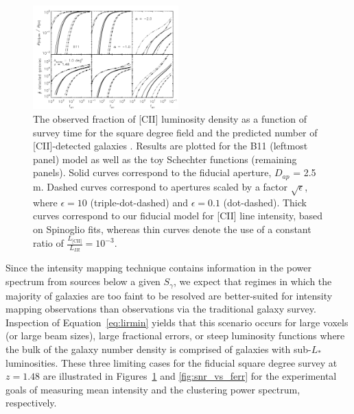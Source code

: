 \documentclass[iop]{emulateapj}
\begin{document}
\begin{figure}
\centering
\includegraphics[width=0.5\textwidth]{Ngal_fracCII_STARFIRE_1sqdeg_z1p5_ferr_0p1vpix_vpix_10vpix_alpham1p0_alpham2p0_b11}
\caption{The observed fraction of [CII] luminosity density as a function of survey time for the square degree field and the predicted number of [CII]-detected galaxies . Results are plotted for the B11 (leftmost panel) model as well as the toy Schechter functions (remaining panels). Solid curves correspond to the fiducial aperture, $D_{ap}$ = 2.5 m. Dashed curves correspond to apertures scaled by a factor $\sqrt{\epsilon}$, where $\epsilon=10$ (triple-dot-dashed) and $\epsilon=0.1$ (dot-dashed). Thick curves correspond to our fiducial model for [CII] line intensity, based on Spinoglio fits, whereas thin curves denote the use of a constant ratio of $\frac{L_{\textrm{[CII]}}}{L_{IR}} = 10^{-3}$.}
\label{fig:ngal_frac}
\end{figure}

Since the intensity mapping technique contains information in the power spectrum from sources below a given $S_{\gamma}$, we expect that regimes in which the majority of galaxies are too faint to be resolved are better-suited for intensity mapping observations than observations via the traditional galaxy survey. Inspection of Equation~\ref{eq:lirmin} yields that this scenario occurs for large voxels (or large beam sizes), large fractional errors, or steep luminosity functions where the bulk of the galaxy number density is comprised of galaxies with sub-$L_*$ luminosities. These three limiting cases for the fiducial square degree survey at $z=1.48$ are illustrated in Figures~\ref{fig:ngal_frac} and \ref{fig:snr_vs_ferr} for the experimental goals of measuring mean intensity and the clustering power spectrum, respectively.
\end{document}
